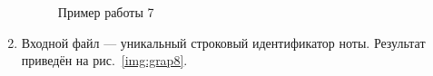 \documentclass[12pt, a4paper]{article}
\begin{document}
\begin{enumerate}
\begin{figure}[h]
  		\caption{Пример работы 7}
  		\label{img:grap7}
	\end{figure}
	\newpage
	\item Входной файл --- уникальный строковый идентификатор ноты.
	Результат приведён на рис.~\ref{img:grap8}.
	\begin{figure}[h]

\end{figure}
\end{enumerate}
\end{document}
